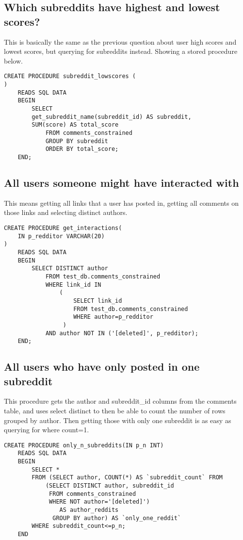     \subsection{Which subreddits have highest and lowest scores?} \label{subsec:subreddit-high-low-scores}
    This is basically the same as the previous question about user high scores and lowest scores, but querying for subreddits instead.
    Showing a stored procedure below.

    \begin{verbatim}
CREATE PROCEDURE subreddit_lowscores (
)
    READS SQL DATA
    BEGIN
        SELECT
        get_subreddit_name(subreddit_id) AS subreddit,
        SUM(score) AS total_score
            FROM comments_constrained
            GROUP BY subreddit
            ORDER BY total_score;
    END;
    \end{verbatim}

    \subsection{All users someone might have interacted with} \label{subsec:potential-interactions}

This means getting all links that a user has posted in, getting all comments on those links and selecting distinct authors.

    \begin{verbatim}
CREATE PROCEDURE get_interactions(
    IN p_redditor VARCHAR(20)
)
    READS SQL DATA
    BEGIN
        SELECT DISTINCT author
            FROM test_db.comments_constrained
            WHERE link_id IN
                (
                    SELECT link_id
                    FROM test_db.comments_constrained
                    WHERE author=p_redditor
                 )
            AND author NOT IN ('[deleted]', p_redditor);
    END;
    \end{verbatim}

    \subsection{All users who have only posted in one subreddit} \label{subsec:only-one-subreddit}

    This procedure gets the author and subreddit\_id columns from the comments table, and uses select distinct to
    then be able to count the number of rows grouped by author.
    Then getting those with only one subreddit is as easy as querying for where count=1.

    \begin{verbatim}
CREATE PROCEDURE only_n_subreddits(IN p_n INT)
    READS SQL DATA
    BEGIN
        SELECT *
        FROM (SELECT author, COUNT(*) AS `subreddit_count` FROM
            (SELECT DISTINCT author, subreddit_id
             FROM comments_constrained
             WHERE NOT author='[deleted]')
                AS author_reddits
              GROUP BY author) AS `only_one_reddit`
        WHERE subreddit_count<=p_n;
    END
    \end{verbatim}